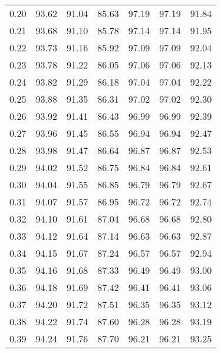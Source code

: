 \begin{tabular}{|c|c|c|c|c|c|c|}
      0.20 &     93.62 &     91.04 &      85.63 &   97.19 &      97.19 &         91.84 \\
      0.21 &     93.68 &     91.10 &      85.78 &   97.14 &      97.14 &         91.95 \\
      0.22 &     93.73 &     91.16 &      85.92 &   97.09 &      97.09 &         92.04 \\
      0.23 &     93.78 &     91.22 &      86.05 &   97.06 &      97.06 &         92.13 \\
      0.24 &     93.82 &     91.29 &      86.18 &   97.04 &      97.04 &         92.22 \\
      0.25 &     93.88 &     91.35 &      86.31 &   97.02 &      97.02 &         92.30 \\
      0.26 &     93.92 &     91.41 &      86.43 &   96.99 &      96.99 &         92.39 \\
      0.27 &     93.96 &     91.45 &      86.55 &   96.94 &      96.94 &         92.47 \\
      0.28 &     93.98 &     91.47 &      86.64 &   96.87 &      96.87 &         92.53 \\
      0.29 &     94.02 &     91.52 &      86.75 &   96.84 &      96.84 &         92.61 \\
      0.30 &     94.04 &     91.55 &      86.85 &   96.79 &      96.79 &         92.67 \\
      0.31 &     94.07 &     91.57 &      86.95 &   96.72 &      96.72 &         92.74 \\
      0.32 &     94.10 &     91.61 &      87.04 &   96.68 &      96.68 &         92.80 \\
      0.33 &     94.12 &     91.64 &      87.14 &   96.63 &      96.63 &         92.87 \\
      0.34 &     94.15 &     91.67 &      87.24 &   96.57 &      96.57 &         92.94 \\
      0.35 &     94.16 &     91.68 &      87.33 &   96.49 &      96.49 &         93.00 \\
      0.36 &     94.18 &     91.69 &      87.42 &   96.41 &      96.41 &         93.06 \\
      0.37 &     94.20 &     91.72 &      87.51 &   96.35 &      96.35 &         93.12 \\
      0.38 &     94.22 &     91.74 &      87.60 &   96.28 &      96.28 &         93.19 \\
      0.39 &     94.24 &     91.76 &      87.70 &   96.21 &      96.21 &         93.25 \\

\end{tabular}
